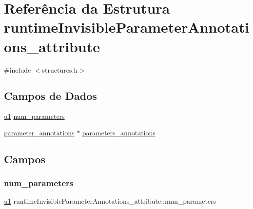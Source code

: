 \hypertarget{structruntimeInvisibleParameterAnnotations__attribute}{}\section{Referência da Estrutura runtime\+Invisible\+Parameter\+Annotations\+\_\+attribute}
\label{structruntimeInvisibleParameterAnnotations__attribute}


{\ttfamily \#include $<$structures.\+h$>$}

\subsection*{Campos de Dados}
\begin{DoxyCompactItemize}
\item 
\hyperlink{lista__operandos_8h_ad9f4cdb6757615aae2fad89dab3c5470}{u1} \hyperlink{structruntimeInvisibleParameterAnnotations__attribute_a9cd7cc3ab3d3b8992aacd54480384375}{num\+\_\+parameters}
\item 
\hyperlink{structparameter__annotations}{parameter\+\_\+annotations} $\ast$ \hyperlink{structruntimeInvisibleParameterAnnotations__attribute_a5e720df1952e818a4b5973aec115eade}{parameters\+\_\+annotations}
\end{DoxyCompactItemize}


\subsection{Campos}
\mbox{\label{structruntimeInvisibleParameterAnnotations__attribute_a9cd7cc3ab3d3b8992aacd54480384375}} 
\subsubsection{\texorpdfstring{num\+\_\+parameters}{num\_parameters}}
{\footnotesize\ttfamily \hyperlink{lista__operandos_8h_ad9f4cdb6757615aae2fad89dab3c5470}{u1} runtime\+Invisible\+Parameter\+Annotations\+\_\+attribute\+::num\+\_\+parameters}

